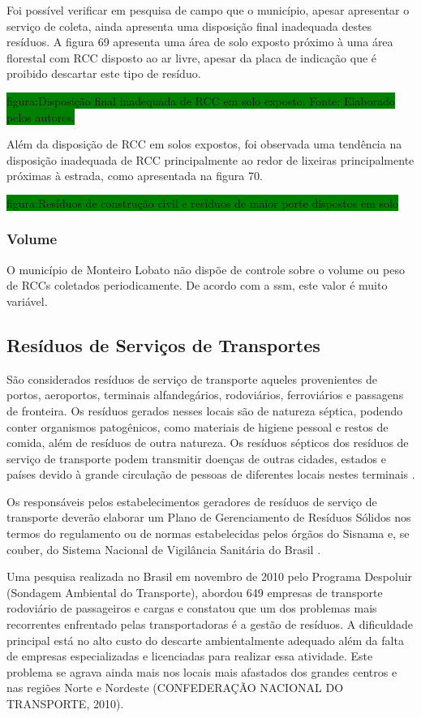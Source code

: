 	Foi possível verificar em pesquisa de campo que o município, apesar apresentar o serviço de coleta, ainda apresenta uma disposição final inadequada destes resíduos. A figura 69 apresenta uma área de solo exposto próximo à uma área florestal com RCC disposto ao ar livre, apesar da placa de indicação que é proibido descartar este tipo de resíduo.
	
	\colorbox{green}{figura:Disposição final inadequada de RCC em solo exposto.  Fonte: Elaborado pelos autores.}
	
	Além da disposição de RCC em solos expostos, foi observada uma tendência na disposição inadequada de RCC principalmente ao redor de lixeiras principalmente próximas à estrada, como apresentada na figura 70.
	
	\colorbox{green}{figura:Resíduos de construção civil e resíduos de maior porte dispostos em solo}
	
	\subsubsection{Volume}
	O município de Monteiro Lobato não dispõe de controle sobre o volume ou peso de RCCs coletados periodicamente. De acordo com a \gls{ssm}, este valor é muito variável.
	
	
	\subsection{Resíduos de Serviços de Transportes}
	
	São considerados resíduos de serviço de transporte aqueles provenientes de portos, aeroportos, terminais alfandegários, rodoviários, ferroviários e passagens de fronteira. Os resíduos gerados nesses locais são de natureza séptica, podendo conter organismos patogênicos, como materiais de higiene pessoal e restos de comida, além de resíduos de outra natureza. Os resíduos sépticos dos resíduos de serviço de transporte podem transmitir doenças de outras cidades, estados e países devido à grande circulação de pessoas de diferentes locais nestes terminais \cite{brasil:12305}.
	
	Os responsáveis pelos estabelecimentos geradores de resíduos de serviço de transporte deverão elaborar um Plano de Gerenciamento de Resíduos Sólidos nos termos do regulamento ou de normas estabelecidas pelos órgãos do Sisnama e, se couber, do Sistema Nacional de Vigilância Sanitária do Brasil \cite{brasil:12305}.
	
	Uma pesquisa realizada no Brasil em novembro de 2010 pelo Programa Despoluir (Sondagem Ambiental do Transporte), abordou 649 empresas de transporte rodoviário de passageiros e cargas e constatou que um dos problemas mais recorrentes enfrentado pelas transportadoras é a gestão de resíduos. A dificuldade principal está no alto custo do descarte ambientalmente adequado além da falta de empresas especializadas e licenciadas para realizar essa atividade. Este problema se agrava ainda mais nos locais mais afastados dos grandes centros e nas regiões Norte e Nordeste (CONFEDERAÇÃO NACIONAL DO TRANSPORTE, 2010).
	
